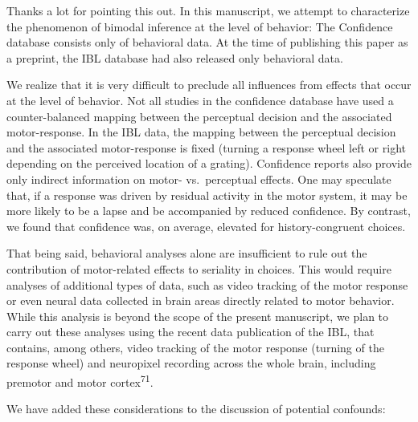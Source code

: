 \documentclass[
]{article}
\begin{document}
Thanks a lot for pointing this out. In this manuscript, we attempt to
characterize the phenomenon of bimodal inference at the level of
behavior: The Confidence database consists only of behavioral data. At
the time of publishing this paper as a preprint, the IBL database had
also released only behavioral data.

We realize that it is very difficult to preclude all influences from
effects that occur at the level of behavior. Not all studies in the
confidence database have used a counter-balanced mapping between the
perceptual decision and the associated motor-response. In the IBL data,
the mapping between the perceptual decision and the associated
motor-response is fixed (turning a response wheel left or right
depending on the perceived location of a grating). Confidence reports
also provide only indirect information on motor- vs.~perceptual effects.
One may speculate that, if a response was driven by residual activity in
the motor system, it may be more likely to be a lapse and be accompanied
by reduced confidence. By contrast, we found that confidence was, on
average, elevated for history-congruent choices.

That being said, behavioral analyses alone are insufficient to rule out
the contribution of motor-related effects to seriality in choices. This
would require analyses of additional types of data, such as video
tracking of the motor response or even neural data collected in brain
areas directly related to motor behavior. While this analysis is beyond
the scope of the present manuscript, we plan to carry out these analyses
using the recent data publication of the IBL, that contains, among
others, video tracking of the motor response (turning of the response
wheel) and neuropixel recording across the whole brain, including
premotor and motor cortex\textsuperscript{71}.

We have added these considerations to the discussion of potential
confounds:
\end{document}

